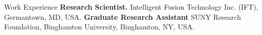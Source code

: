 \begin{rubric}{Work Experience}
\entry*[2023 -- Present]%
	\textbf{Research Scientist.} Intelligent Fusion Technology Inc. (IFT), Germantown, MD, USA.
%
%
\entry*[2018 -- 2023]%
	\textbf{Graduate Research Assistant} SUNY Research Foundation, Binghamton University, Binghamton, NY, USA.
%
\end{rubric}
